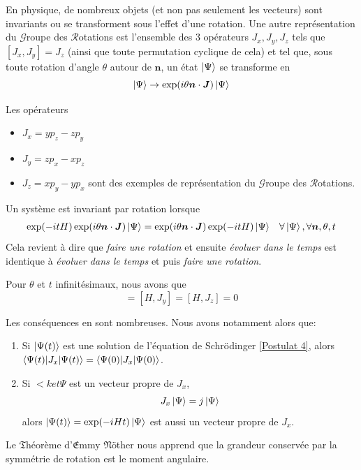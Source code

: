 \documentclass[../notesdecours.tex]{subfiles}
\begin{document}
En physique, de nombreux objets (et non pas seulement les vecteurs) sont invariants ou se transforment sous l'effet d'une rotation. Une autre représentation du $\mathcal{G}$roupe des $\mathcal{R}$otations est l'ensemble des 3 opérateurs $J_x,J_y,J_z$ tels que $[J_x,J_y] = J_z$ (ainsi que toute permutation cyclique de cela) et tel que, sous toute rotation d'angle $\theta$ autour de $\bm{n}$, un état $\ket{\Psi}$ se transforme en
\begin{equation}
\ket{\Psi} \rightarrow \exp(i\theta\bm{n}\cdot\bm{J})\ket{\Psi}
\end{equation}

\begin{exemple}Les opérateurs
\begin{itemize}
\item $J_x = yp_z - zp_y$
\item $J_y = zp_x - xp_z$
\item $J_z = xp_y - yp_x$
sont des exemples de représentation du $\mathcal{G}$roupe des $\mathcal{R}$otations.
\end{itemize}
\end{exemple}
Un système est invariant par rotation lorsque
\begin{align*}
\exp (-itH) \exp (i\theta \bm{n}\cdot\bm{J})\ket{\Psi} &= \exp (i\theta \bm{n}\cdot\bm{J})\exp (-itH) \ket{\Psi}			&\forall \ket{\Psi},\forall \bm{n},\theta,t
\end{align*}
Cela revient à dire que \emph{faire une rotation} et ensuite \emph{évoluer dans le temps} est identique à \emph{évoluer dans le temps} et puis \emph{faire une rotation}.\\
\begin{lemma} Pour $\theta$ et $t$ infinitésimaux, nous avons que 
\begin{equation}
[H,J_x] = [H,J_y] = [H,J_z] = 0
\end{equation}
\end{lemma}
Les conséquences en sont nombreuses. Nous avons notamment alors que:
\begin{enumerate}
\item Si $\ket{\Psi(t)}$ est une solution de l'équation de Schrödinger \eqref{Postulat 4}, alors $\braket{\Psi(t)|J_x|\Psi(t)} = \braket{\Psi(0)|J_x|\Psi(0)}$.
\item Si $<ket{\Psi}$ est un vecteur propre de $J_x$,
\begin{equation}
J_x\ket{\Psi} = j\ket{\Psi}
\end{equation}
alors $\ket{\Psi(t)} = \exp (-iHt)\ket{\Psi}$ est aussi un vecteur propre de $J_x$.
\end{enumerate}
Le $\mathfrak{T}$héorème d'$\mathfrak{E}$mmy $\mathfrak{N}$öther nous apprend que la grandeur conservée par la symmétrie de rotation est le moment angulaire.
\end{document}
